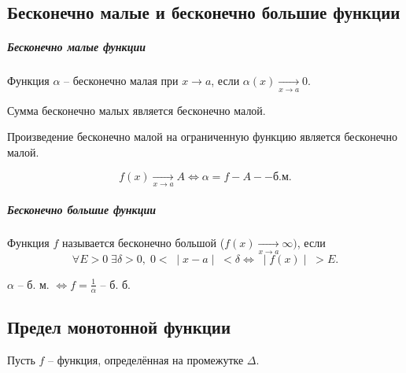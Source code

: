 \subsection{Бесконечно малые и бесконечно большие функции}
\subparagraph{Бесконечно малые функции}
\begin{Definition}
Функция $\alpha$ -- бесконечно малая при $x \rightarrow a$, если $\alpha(x) \xrightarrow[x \rightarrow a]{} 0$.
\end{Definition}
\begin{Theorem}Сумма бесконечно малых является бесконечно малой.\end{Theorem}
\begin{Theorem}Произведение бесконечно малой на ограниченную функцию является бесконечно малой. \end{Theorem}
\begin{Theorem}
$$f(x) \xrightarrow[x \rightarrow a]{} A \Leftrightarrow \alpha = f - A -- б. м.$$
\end{Theorem}
\subparagraph{Бесконечно большие функции}
\begin{Definition}Функция $f$ называется бесконечно большой ($f(x) \xrightarrow[x \rightarrow a]{} \infty)$, если
$$\forall E > 0 \; \exists \delta > 0, \; 0 < \; \mid x - a \mid \; < \delta \Leftrightarrow \; \mid f(x) \mid \; > E.$$
\end{Definition}

\begin{Theorem} $\alpha$ -- б. м. $\Leftrightarrow f = \frac{1}{\alpha}$ -- б. б. \end{Theorem}

\subsection{Предел монотонной функции}
\begin{Definition}
Пусть $f$ -- функция, определённая на промежутке $\Delta$.
\end{Definition}

